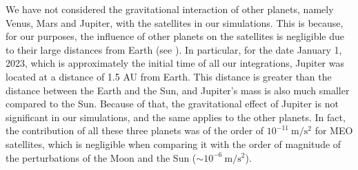 \documentclass[../main.tex]{subfiles}
\begin{document}
We have not considered the gravitational interaction of other planets, namely Venus, Mars and Jupiter, with the satellites in our simulations. This is because, for our purposes, the influence of other planets on the satellites is negligible due to their large distances from Earth (see \cite{montenbruck}). In particular, for the date January 1, 2023, which is approximately the initial time of all our integrations, Jupiter was located at a distance of 1.5 AU from Earth. This distance is greater than the distance between the Earth and the Sun, and Jupiter's mass is also much smaller compared to the Sun. Because of that, the gravitational effect of Jupiter is not significant in our simulations, and the same applies to the other planets. In fact, the contribution of all these three planets was of the order of $10^{-11}\ \mathrm{m/s^2}$ for MEO satellites, which is negligible when comparing it with the order of magnitude of the perturbations of the Moon and the Sun ($\sim 10^{-6}\ \mathrm{m/s^2}$).
\end{document}
